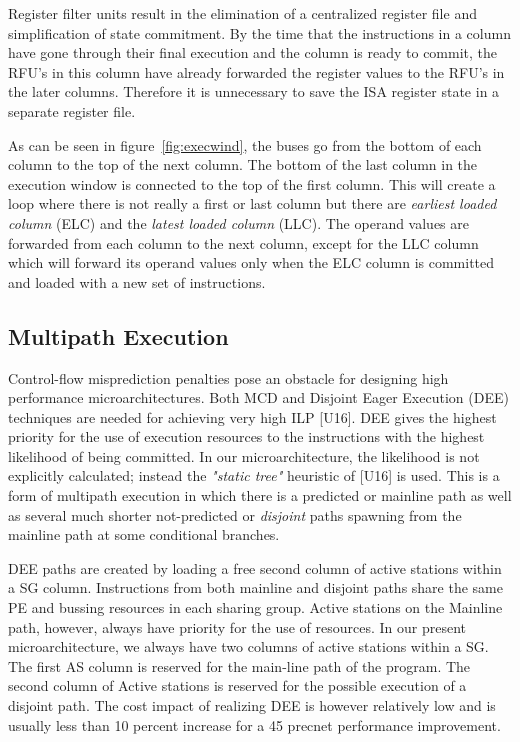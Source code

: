 \documentclass[10pt,twocolumn]{IEEEtran}
\begin{document}
Register filter units result in the elimination of a centralized
register file and simplification of state commitment.  By the time that
the instructions in a column have gone through their final execution
and the column is ready to commit, the RFU's in this column have
already forwarded the register values to the RFU's in the later
columns.  Therefore it is unnecessary to save the ISA register state in
a separate register file.

As can be seen in figure~\ref{fig:execwind}, the buses go from the
bottom of each column to the top of the next column.  The bottom of the
last column in the execution window is connected to the top of the
first column.  This will create a loop where there is not really a
first or last column but there are \emph{earliest loaded column} (ELC)
and the \emph{latest loaded column} (LLC).  The operand values are
forwarded from each column to the next column, except for the LLC
column which will forward its operand values only when the ELC column
is committed and loaded with a new set of instructions.

\subsection {Multipath Execution}

Control-flow misprediction penalties pose an obstacle for designing
high performance microarchitectures.  Both MCD and Disjoint Eager
Execution (DEE) techniques are needed for achieving very high ILP
[U16].  DEE gives the highest priority for the use of execution
resources to the instructions with the highest likelihood of being
committed.  In our microarchitecture, the likelihood is not explicitly
calculated; instead the \emph{"static tree"} heuristic of [U16] is
used.  This is a form of multipath execution in which there is a
predicted or mainline path as well as several much shorter
not-predicted or \emph{disjoint} paths spawning from the mainline path
at some conditional branches.

DEE paths are created by loading a free second column of active
stations within a SG column.  Instructions from both mainline and
disjoint paths share the same PE and bussing resources in each sharing
group.  Active stations on the Mainline path, however, always have
priority for the use of resources.  In our present microarchitecture,
we always have two columns of active stations within a SG. The first AS
column is reserved for the main-line path of the program. The second
column of Active stations is reserved for the possible execution of a
disjoint path.  The cost impact of realizing DEE is however relatively
low and is usually less than 10 percent increase for a 45 precnet
performance improvement.
\end{document}
